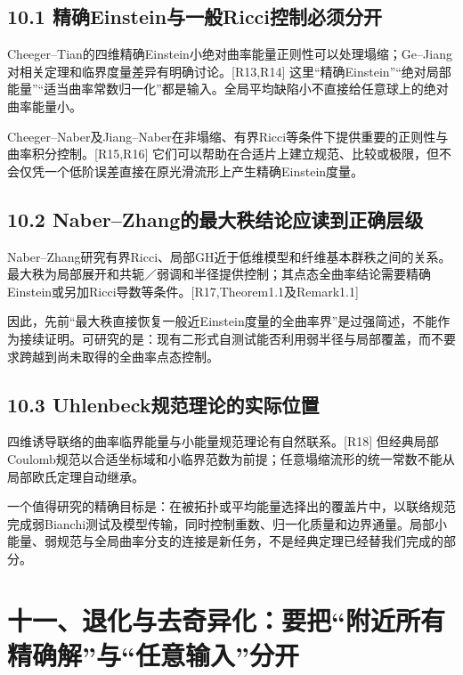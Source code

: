 \documentclass[
  11pt,
  a4paper,
  fontset=none]{ctexart}
\begin{document}
\subsection{10.1
精确Einstein与一般Ricci控制必须分开}\label{ux7cbeux786eeinsteinux4e0eux4e00ux822cricciux63a7ux5236ux5fc5ux987bux5206ux5f00}

Cheeger--Tian的四维精确Einstein小绝对曲率能量正则性可以处理塌缩；Ge--Jiang对相关定理和临界度量差异有明确讨论。{[}R13,R14{]}
这里``精确Einstein''``绝对局部能量''``适当曲率常数归一化''都是输入。全局平均缺陷小不直接给任意球上的绝对曲率能量小。

Cheeger--Naber及Jiang--Naber在非塌缩、有界Ricci等条件下提供重要的正则性与曲率积分控制。{[}R15,R16{]}
它们可以帮助在合适片上建立规范、比较或极限，但不会仅凭一个低阶误差直接在原光滑流形上产生精确Einstein度量。

\subsection{10.2
Naber--Zhang的最大秩结论应读到正确层级}\label{naberzhangux7684ux6700ux5927ux79e9ux7ed3ux8bbaux5e94ux8bfbux5230ux6b63ux786eux5c42ux7ea7}

Naber--Zhang研究有界Ricci、局部GH近于低维模型和纤维基本群秩之间的关系。最大秩为局部展开和共轭／弱调和半径提供控制；其点态全曲率结论需要精确Einstein或另加Ricci导数等条件。{[}R17,Theorem1.1及Remark1.1{]}

因此，先前``最大秩直接恢复一般近Einstein度量的全曲率界''是过强简述，不能作为接续证明。可研究的是：现有二形式自测试能否利用弱半径与局部覆盖，而不要求跨越到尚未取得的全曲率点态控制。

\subsection{10.3
Uhlenbeck规范理论的实际位置}\label{uhlenbeckux89c4ux8303ux7406ux8bbaux7684ux5b9eux9645ux4f4dux7f6e}

四维诱导联络的曲率临界能量与小能量规范理论有自然联系。{[}R18{]}
但经典局部Coulomb规范以合适坐标域和小临界范数为前提；任意塌缩流形的统一常数不能从局部欧氏定理自动继承。

一个值得研究的精确目标是：在被拓扑或平均能量选择出的覆盖片中，以联络规范完成弱Bianchi测试及模型传输，同时控制重数、归一化质量和边界通量。局部小能量、弱规范与全局曲率分支的连接是新任务，不是经典定理已经替我们完成的部分。

\section{十一、退化与去奇异化：要把``附近所有精确解''与``任意输入''分开}\label{ux5341ux4e00ux9000ux5316ux4e0eux53bbux5947ux5f02ux5316ux8981ux628aux9644ux8fd1ux6240ux6709ux7cbeux786eux89e3ux4e0eux4efbux610fux8f93ux5165ux5206ux5f00}
\end{document}
